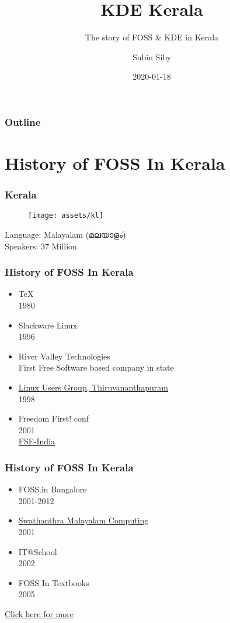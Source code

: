\documentclass{beamer}
\title{KDE Kerala}
\subtitle{The story of FOSS \& KDE in Kerala}
\author{Subin Siby}
\institute{subinsb.com/s/cki2020}
\date{2020-01-18}
\def\manjari{\fontspec[Script=Malayalam]{Manjari}}
\begin{document}
\begin{frame}
	\maketitle
\end{frame}

\begin{frame}
\frametitle{Outline}
\tableofcontents
\end{frame}

\section{History of FOSS In Kerala}
\begin{frame}
	\frametitle{Kerala}
	
	\begin{figure}
		\texttt{[image: assets/kl]}
	\end{figure}
	
	{\small \manjari
	Language: Malayalam (മലയാളം) \\
	Speakers: 37 Million
	}
\end{frame}
\begin{frame}
	\frametitle{History of FOSS In Kerala}
	\begin{itemize}
		\item TeX \\ 1980
		\item Slackware Linux \\ 1996
		\item River Valley Technologies \\ First Free Software based company in state
		\item \href{https://en.wikipedia.org/wiki/Free_Software_Users_Group,_Thiruvananthapuram}{Linux Users Group, Thiruvananthapuram} \\ 1998
		\item Freedom First! conf \\ 2001 \\ \href{https://www.gnu.org/press/2001-07-20-FSF-India.html}{FSF-India}
	\end{itemize}
\end{frame}

\begin{frame}
\frametitle{History of FOSS In Kerala}
\begin{itemize}
	\item FOSS.in Bangalore \\ 2001-2012
	\item \href{https://smc.org.in}{Swathanthra Malayalam Computing} \\ 2001
	\item IT@School \\ 2002
	\item FOSS In Textbooks \\ 2005
\end{itemize}
\href{https://swatantryam.blogspot.com/2007/08/story-of-free-software-in-kerala-india.html}{{\tiny Click here for more}}
\end{frame}
\end{document}
